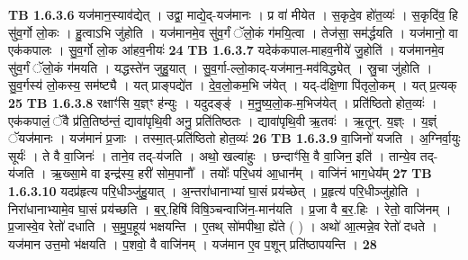 \documentclass[17pt]{extarticle}
\begin{document}
                  \newline
                                \textbf{ TB 1.6.3.6} \newline
                  यज॑मान॒स्याव॑द्येत् । उद्वा॒ माद्ये॒द्-यज॑मानः । प्र वा॑ मीयेत । स॒कृदे॒व हो॑त॒व्यः॑ । स॒कृदि॑व॒ हि सु॑व॒र्गो लो॒कः । हु॒त्वाऽभि जु॑होति । यज॑मानमे॒व सु॑व॒र्गं ॅलो॒कं ग॑मयि॒त्वा । तेज॑सा॒ सम॑र्द्धयति । यज॑मानो॒ वा एक॑कपालः । सु॒व॒र्गो लो॒क आ॑हव॒नीयः॑ \textbf{ 24} \newline
                  \newline
                                \textbf{ TB 1.6.3.7} \newline
                  यदेक॑कपाल-माहव॒नीये॑ जु॒होति॑ । यज॑मानमे॒व सु॑व॒र्गं ॅलो॒कं ग॑मयति । यद्धस्ते॑न जुहु॒यात् । सु॒व॒र्गा-ल्लो॒काद्-यज॑मान॒-मव॑विद्ध्येत् । स्रु॒चा जु॑होति । सु॒व॒र्गस्य॑ लो॒कस्य॒ सम॑ष्ट्यै । यत् प्राङ्पद्ये॑त । दे॒व॒लो॒कम॒भि ज॑येत् । यद्-द॑क्षि॒णा पि॑तृलो॒कम् । यत् प्र॒त्यक् \textbf{ 25} \newline
                  \newline
                                \textbf{ TB 1.6.3.8} \newline
                  रक्षाꣳ॑सि य॒ज्ञ्ꣳ ह॑न्युः । यदुदङ्ङ्॑ । म॒नु॒ष्य॒लो॒क-म॒भिज॑येत् । प्रति॑ष्ठितो होत॒व्यः॑ । एक॑कपालं॒ ॅवै प्र॑ति॒तिष्ठ॑न्तं॒ द्यावा॑पृथि॒वी अनु॒ प्रति॑तिष्ठतः । द्यावा॑पृथि॒वी ऋ॒तवः॑ । ऋ॒तून्. य॒ज्ञ्ः । य॒ज्ञ्ं ॅयज॑मानः । यज॑मानं प्र॒जाः । तस्मा॒त्-प्रति॑ष्ठितो होत॒व्यः॑ \textbf{ 26} \newline
                  \newline
                                \textbf{ TB 1.6.3.9} \newline
                  वा॒जिनो॑ यजति । अ॒ग्निर्वा॒युः सूर्यः॑ । ते वै वा॒जिनः॑ । ताने॒व तद्-य॑जति । अथो॒ खल्वा॑हुः । छन्दाꣳ॑सि॒ वै वा॒जिन॒ इति॑ । तान्ये॒व तद्-य॑जति । ऋ॒ख्सा॒मे वा इन्द्र॑स्य॒ हरी॑ सोम॒पानौ᳚ । तयोः᳚ परि॒धय॑ आ॒धान᳚म् । वाजि॑नं भाग॒धेय᳚म् \textbf{ 27} \newline
                  \newline
                                \textbf{ TB 1.6.3.10} \newline
                  यदप्र॑हृत्य परि॒धीञ्जु॑हु॒यात् । अ॒न्तरा॑धानाभ्यां घा॒सं प्रय॑च्छेत् । प्र॒हृत्य॑ परि॒धीञ्जु॑होति । निरा॑धानाभ्यामे॒व घा॒सं प्रय॑च्छति । ब॒र्॒.हिषि॑ विषि॒ञ्चन्वाजि॑न॒-मान॑यति । प्र॒जा वै ब॒र॒.हिः । रेतो॒ वाजि॑नम् । प्र॒जास्वे॒व रेतो॑ दधाति । स॒मु॒प॒हूय॑ भक्षयन्ति । ए॒तथ् सो॑मपीथा॒ ह्ये॑ते ( ) । अथो॑ आ॒त्मन्ने॒व रेतो॑ दधते । यज॑मान उत्त॒मो भ॑क्षयति । प॒शवो॒ वै वाजि॑नम् । यज॑मान ए॒व प॒शून् प्रति॑ष्ठापयन्ति । \textbf{ 28} \newline
\end{document}
